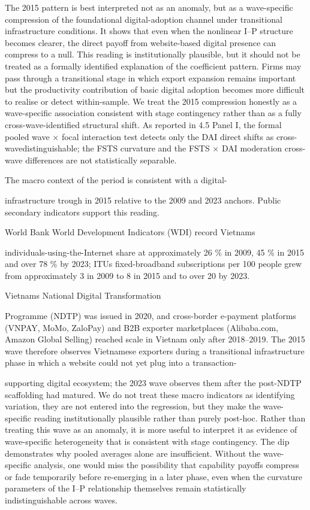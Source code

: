 \documentclass[12pt,a4paper]{article}
\begin{document}
The 2015 pattern is best interpreted not as an anomaly, but as a
wave-specific compression of the foundational digital-adoption channel
under transitional infrastructure conditions. It shows that even when
the nonlinear I--P structure becomes clearer, the direct payoff from
website-based digital presence can compress to a null. This reading is
institutionally plausible, but it should not be treated as a formally
identified explanation of the coefficient pattern. Firms may pass
through a transitional stage in which export expansion remains important
but the productivity contribution of basic digital adoption becomes more
difficult to realise or detect within-sample. We treat the 2015
compression honestly as a wave-specific association consistent with
stage contingency rather than as a fully cross-wave-identified
structural shift. As reported in 4.5 Panel I, the formal pooled wave ×
focal interaction test detects only the DAI direct shifts as
cross-wavedistinguishable; the FSTS curvature and the FSTS × DAI
moderation cross-wave differences are not statistically separable.

The macro context of the period is consistent with a digital-

infrastructure trough in 2015 relative to the 2009 and 2023 anchors.
Public secondary indicators support this reading.

World Bank World Development Indicators (WDI) record
Vietnam\textquotesingle s

individuals-using-the-Internet share at approximately 26 \% in 2009, 45
\% in 2015 and over 78 \% by 2023; ITU\textquotesingle s fixed-broadband
subscriptions per 100 people grew from approximately 3 in 2009 to 8 in
2015 and to over 20 by 2023.

Vietnam\textquotesingle s National Digital Transformation

Programme (NDTP) was issued in 2020, and cross-border e-payment
platforms (VNPAY, MoMo, ZaloPay) and B2B exporter marketplaces
(Alibaba.com, Amazon Global Selling) reached scale in Vietnam only after
2018--2019. The 2015 wave therefore observes Vietnamese exporters during
a transitional infrastructure phase in which a website could not yet
plug into a transaction-

supporting digital ecosystem; the 2023 wave observes them after the
post-NDTP scaffolding had matured. We do not treat these macro
indicators as identifying variation, they are not entered into the
regression, but they make the wave-specific reading institutionally
plausible rather than purely post-hoc. Rather than treating this wave as
an anomaly, it is more useful to interpret it as evidence of
wave-specific heterogeneity that is consistent with stage contingency.
The dip demonstrates why pooled averages alone are insufficient. Without
the wave-specific analysis, one would miss the possibility that
capability payoffs compress or fade temporarily before re-emerging in a
later phase, even when the curvature parameters of the I--P relationship
themselves remain statistically indistinguishable across waves.
\end{document}
